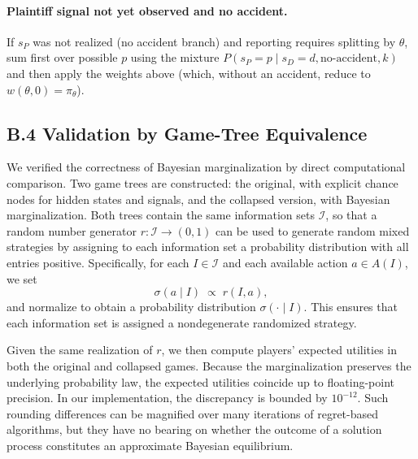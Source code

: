 \documentclass{article}
\begin{document}
\paragraph{Plaintiff signal not yet observed and no accident.}
If $s_P$ was not realized (no accident branch) and reporting requires splitting by $\theta$, sum first over possible $p$ using the mixture $P(s_P=p\mid s_D=d,\text{no-accident},k)$ and then apply the weights above (which, without an accident, reduce to $w(\theta,0)=\pi_\theta$).



\subsection*{B.4 Validation by Game-Tree Equivalence}

We verified the correctness of Bayesian marginalization by direct computational comparison. Two game trees are constructed: the original, with explicit chance nodes for hidden states and signals, and the collapsed version, with Bayesian marginalization. Both trees contain the same information sets $\mathcal{I}$, so that a random number generator $r:\mathcal{I}\to(0,1)$ can be used to generate random mixed strategies by assigning to each information set a probability distribution with all entries positive. Specifically, for each $I\in \mathcal{I}$ and each available action $a\in A(I)$, we set
\[
\sigma(a\mid I) \;\propto\; r(I,a),
\]
and normalize to obtain a probability distribution $\sigma(\cdot\mid I)$. This ensures that each information set is assigned a nondegenerate randomized strategy.

Given the same realization of $r$, we then compute players’ expected utilities in both the original and collapsed games. Because the marginalization preserves the underlying probability law, the expected utilities coincide up to floating-point precision. In our implementation, the discrepancy is bounded by $10^{-12}$. Such rounding differences can be magnified over many iterations of regret-based algorithms, but they have no bearing on whether the outcome of a solution process constitutes an approximate Bayesian equilibrium.



\printbibliography
\end{document}
